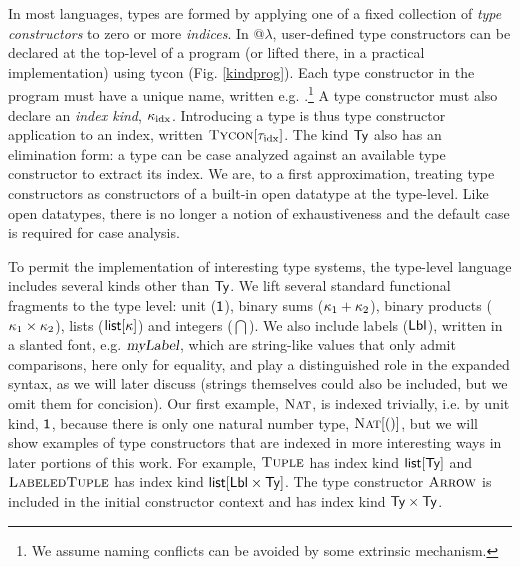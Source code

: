 \documentclass[9pt,preprint]{sigplanconf}
\begin{document}
In most languages, types are formed by applying one of a fixed collection of \emph{type constructors} to zero or more \emph{indices}. In @$\lambda$, user-defined type constructors can be declared at the top-level of a program (or lifted there, in a practical implementation) using \textsf{tycon} (Fig. \ref{kindprog}). Each type constructor in the program must have a unique name, written e.g. .\footnote{We assume naming conflicts can be avoided by some extrinsic mechanism.} A type constructor must also declare an \emph{index kind}, $\kappa_{\text{idx}}$. Introducing a type is thus type constructor application to an index, written $\textsc{Tycon}[{\tau_{\text{idx}}}]$. The kind $\textsf{Ty}$ also has an elimination form: a type can be case analyzed against an available type constructor to extract its index. We are, to a first approximation, treating type constructors as constructors of a built-in open datatype at the type-level. Like open datatypes, there is no longer a notion of exhaustiveness and the default case is required for case analysis.

 To permit the implementation of interesting type systems, the type-level language includes several kinds other than $\textsf{Ty}$. We lift several  standard functional fragments to the type level: unit ($\textsf{1}$), binary sums ($\kappa_1 + \kappa_2$), binary products ($\kappa_1 \times \kappa_2$), lists ($\textsf{list}[\kappa]$) and integers ($\dint$). We also include labels ($\textsf{Lbl}$), written in a slanted font, e.g. $\textsl{myLabel}$, which are string-like values that only admit comparisons, here only for equality, and play a distinguished role in the expanded syntax, as we will later discuss (strings themselves could also be included, but we omit them for concision). Our first example, $\textsc{Nat}$, is indexed trivially, i.e. by unit kind, $\textsf{1}$, because there is only one natural number type, $\textsc{Nat}[()]$, but we will show examples of type constructors that are indexed in more interesting ways in later portions of this work. For example, $\textsc{Tuple}$ has index kind $\textsf{list}[\textsf{Ty}]$ and $\textsc{LabeledTuple}$ has index kind $\textsf{list}[\textsf{Lbl} \times \textsf{Ty}]$. The type constructor $\textsc{Arrow}$ is included in the initial constructor context and has index kind $\textsf{Ty} \times \textsf{Ty}$. 
\end{document}
